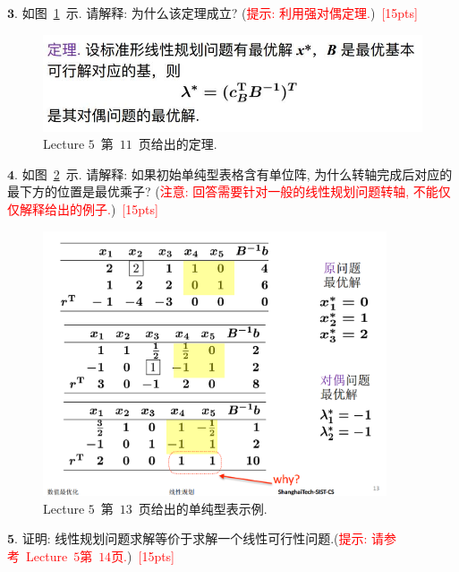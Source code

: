 \documentclass[10pt]{article}
\begin{document}
$\bm{3}.$ 
如图~\ref{fig: thm}~示.  请解释: 为什么该定理成立? (\textcolor{red}{提示: 利用强对偶定理.})~\textcolor{red}{[15pts]}
\begin{figure}[h!]
	\centering
	\includegraphics[width=5in]{thm.jpg}
	\caption{Lecture $5$~第~$11$~页给出的定理.}
	\label{fig: thm}
\end{figure}

$\bm{4}.$
如图~\ref{fig: pivot}~示. 请解释: 如果初始单纯型表格含有单位阵, 为什么转轴完成后对应的最下方的位置是最优乘子? (\textcolor{red}{注意: 回答需要针对一般的线性规划问题转轴, 不能仅仅解释给出的例子.})~\textcolor{red}{[15pts]}
\begin{figure}[h!]
	\centering
	\includegraphics[width=4in]{pivot.jpg}
	\caption{Lecture $5$~第~$13$~页给出的单纯型表示例.}
	\label{fig: pivot}
\end{figure}


$\bm{5}.$
证明: 线性规划问题求解等价于求解一个线性可行性问题.(\textcolor{red}{提示: 请参考~Lecture~$5$第~$14$页.})~\textcolor{red}{[15pts]}
\end{document}

